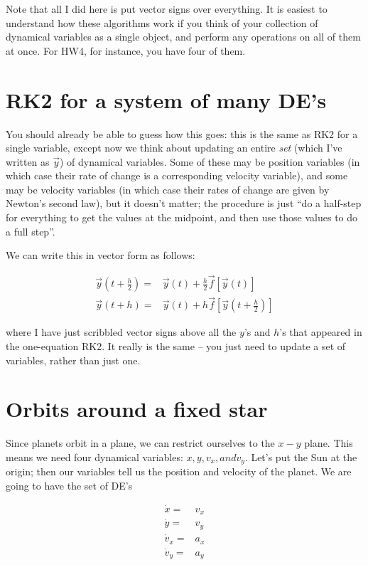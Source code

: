 \documentclass[12ampt]{article}
\begin{document}
Note that all I did here is put vector signs over everything. It is easiest to understand how these algorithms work if you think of your collection of dynamical variables as a single object, and 
perform any operations on all of them at once. For HW4, for instance, you have four of them.

\section {RK2 for a system of many DE's}

You should already be able to guess how this goes: this is the same as RK2 for a single variable, except now we think about updating an entire {\it set} (which I've written as $\vec y$)  of dynamical variables. Some of these may be position variables 
(in which case their rate of change is a corresponding velocity variable), and some may be velocity variables (in which case their rates of change are given by Newton's second law), but it doesn't matter; the procedure is just ``do a half-step
for everything to get the values at the midpoint, and then use those values to do a full step''. 

We can write this in vector form as follows:

\begin{align}
    \vec y(t+\frac{h}{2}) =& \vec y(t) + \frac{h}{2} \vec f\left[\vec y\left(t\right)\right] \\
    \vec y(t+h) =& \vec y(t) + h \vec f\left[\vec y\left(t+\frac{h}{2}\right)\right]
\end{align}

where I have just scribbled vector signs above all the $y$'s and $h$'s that appeared in the one-equation RK2. It really is the same -- you just need to update a set of variables, rather than just one.

\section{Orbits around a fixed star}

Since planets orbit in a plane, we can restrict ourselves to the $x-y$ plane. This means we need four dynamical variables: $x, y, v_x, and v_y$. Let's put the Sun at the origin; then our variables tell us the position and velocity 
of the planet. We are going to have the set of DE's

\begin{align}
  \dot x =& v_x \\
  \dot y =& v_y \\
  \dot v_x =& a_x \\
  \dot v_y =& a_y \\
\end{align}
\end{document}
